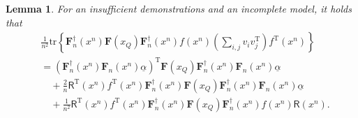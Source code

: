 \documentclass{article} %
\theoremstyle{plain} %
\newtheorem{lemma}[theorem]{Lemma}          %
\begin{document}
\begin{lemma}\label{lem:aFa_comple_incomplete_insufficient}
For an insufficient demonstrations and an incomplete model, it holds that
\begin{align*}
& \frac1{n^2}\mathrm{tr}\left\{ \mathbf{F}_n^{\dagger}(x^n)\mathbf{F}(x_Q)\mathbf{F}_n^{\dagger}(x^n) f(x^n)\left(\sum_{i,j}v_iv_j^\mathrm{T}\right) f^\mathrm{T}(x^n)\right\}\\
& = \left(\mathbf{F}_n^{\dagger}(x^n)\mathbf{F}_n(x^n)\underline{\alpha}\right)^\mathrm{T}\mathbf{F}(x_Q) \mathbf{F}_n^{\dagger}(x^n)\mathbf{F}_n(x^n)\underline{\alpha}\\
& \quad + \frac2n \mathsf{R}^\mathrm{T}(x^n)f^\mathrm{T}(x^n)\mathbf{F}_n^{\dagger}(x^n) \mathbf{F}(x_Q)\mathbf{F}_n^{\dagger}(x^n) \mathbf{F}_n(x^n)\underline{\alpha}\\
&\quad + \frac1{n^2}  \mathsf{R}^\mathrm{T}(x^n)f^\mathrm{T}(x^n)\mathbf{F}_n^{\dagger}(x^n) \mathbf{F}(x_Q)\mathbf{F}_n^{\dagger}(x^n) f(x^n) \mathsf{R}(x^n).
\end{align*}
\end{lemma}
\end{document}
